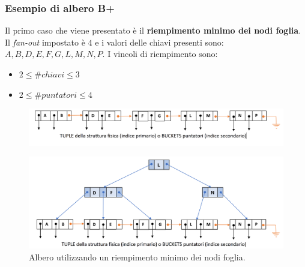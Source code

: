 \documentclass[a4paper]{article}
\begin{document}
	\subsubsection{Esempio di albero B+}\label{par: esempio di albero B+}
	
	Il primo caso che viene presentato è il \textcolor{Green4}{\textbf{riempimento minimo dei nodi foglia}}. Il \emph{fan-out} impostato è $4$ e i valori delle chiavi presenti sono: $A,B,D,E,F,G,L,M,N,P$. I vincoli di riempimento sono:
	\begin{itemize}
		\item $2 \le \#chiavi \le 3$
		\item $2 \le \#puntatori \le 4$
	\end{itemize}
	\begin{figure}[!htp]
		\centering
		\includegraphics[width=\textwidth]{img/esempio_riempimento_minimo.png}
	\end{figure}
	\begin{figure}[!htp]
		\centering
		\includegraphics[width=\textwidth]{img/esempio_riempimento_minimo-albero.png}
		\caption{Albero utilizzando un riempimento minimo dei nodi foglia.}
	\end{figure}
	
\end{document}
